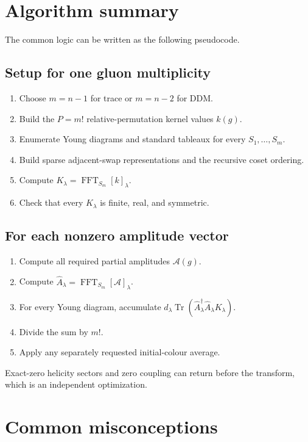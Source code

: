 \documentclass[11pt,a4paper]{article}
\newcommand{\Tr}{\operatorname{Tr}}
\newcommand{\cA}{\mathcal{A}}
\begin{document}
\section{Algorithm summary}

The common logic can be written as the following pseudocode.

\subsection*{Setup for one gluon multiplicity}

\begin{enumerate}
  \item Choose $m=n-1$ for trace or $m=n-2$ for DDM.
  \item Build the $P=m!$ relative-permutation kernel values $k(g)$.
  \item Enumerate Young diagrams and standard tableaux for every
        $S_1,\ldots,S_m$.
  \item Build sparse adjacent-swap representations and the recursive coset
        ordering.
  \item Compute $K_\lambda=\operatorname{FFT}_{S_m}[k]_\lambda$.
  \item Check that every $K_\lambda$ is finite, real, and symmetric.
\end{enumerate}

\subsection*{For each nonzero amplitude vector}

\begin{enumerate}
  \item Compute all required partial amplitudes $\cA(g)$.
  \item Compute
        $\widehat A_\lambda=\operatorname{FFT}_{S_m}[\cA]_\lambda$.
  \item For every Young diagram, accumulate
        $d_\lambda\Tr(
          \widehat A_\lambda^\dagger
          \widehat A_\lambda K_\lambda)$.
  \item Divide the sum by $m!$.
  \item Apply any separately requested initial-colour average.
\end{enumerate}

Exact-zero helicity sectors and zero coupling can return before the transform,
which is an independent optimization.

\section{Common misconceptions}
\end{document}
